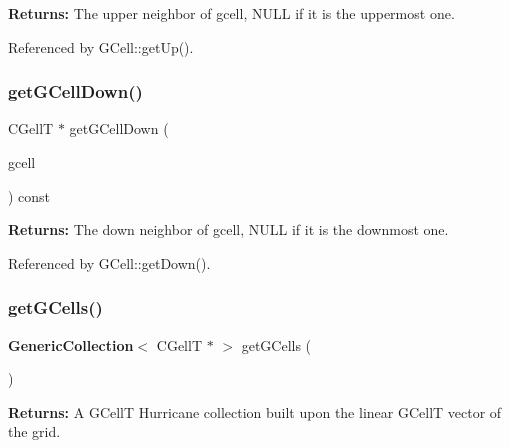 {\bfseries Returns\+:} The upper neighbor of {\ttfamily gcell}, {\ttfamily N\+U\+LL} if it is the uppermost one. 

Referenced by G\+Cell\+::get\+Up().

\mbox{\label{classKatabatic_1_1Grid_a4288eb8b1357d9800341b82df6b23944}} 
\subsubsection{\texorpdfstring{get\+G\+Cell\+Down()}{getGCellDown()}}
{\footnotesize\ttfamily C\+GellT $\ast$ get\+G\+Cell\+Down (\begin{DoxyParamCaption}\item[{const G\+CellT $\ast$}]{gcell }\end{DoxyParamCaption}) const\hspace{0.3cm}{\ttfamily [inline]}}

{\bfseries Returns\+:} The down neighbor of {\ttfamily gcell}, {\ttfamily N\+U\+LL} if it is the downmost one. 

Referenced by G\+Cell\+::get\+Down().

\mbox{\label{classKatabatic_1_1Grid_a24b4ab5b46b56ee744cf4c368a114d95}} 
\subsubsection{\texorpdfstring{get\+G\+Cells()}{getGCells()}}
{\footnotesize\ttfamily \textbf{ Generic\+Collection}$<$ C\+GellT $\ast$ $>$ get\+G\+Cells (\begin{DoxyParamCaption}{ }\end{DoxyParamCaption})\hspace{0.3cm}{\ttfamily [inline]}}

{\bfseries Returns\+:} A G\+CellT Hurricane collection built upon the linear G\+CellT vector of the grid. \mbox{\label{classKatabatic_1_1Grid_aa8d0393323104d48c089a8429b254689}} 

